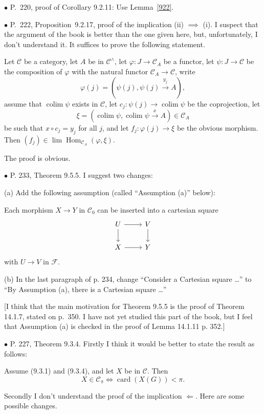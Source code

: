 \documentclass[12pt]{article}
\theoremstyle{remark}
\newcommand{\bu}{\bullet}
\newcommand{\n}{\noindent}
\newcommand{\cc}{\mathcal}
\newcommand{\C}{\mathcal C}
\newcommand{\p}{\varphi}
\newcommand{\xr}{\xrightarrow}
\newcommand{\be}{\begin{equation}}
\newcommand{\ee}{\end{equation}}
\newcommand{\pr}{Proposition}
\DeclareMathOperator*{\co}{colim}
\DeclareMathOperator{\ca}{card}
\DeclareMathOperator{\card}{card}
\DeclareMathOperator{\h}{Hom}
\begin{document}

\n$\bu$ P.~220, proof of Corollary 9.2.11: Use Lemma~\ref{922}.


\n$\bu$ P.~222, \pr\ 9.2.17, proof of the implication (ii) $\implies$ (i). I suspect that the argument of the book is better than the one given here, but, unfortunately, I don't understand it. It suffices to prove the following statement. 

Let $\C$ be a category, let $A$ be in $\C^\wedge$, let $\p:J\to\C_A$ be a functor, let $\psi:J\to\C$ be the composition of $\p$ with the natural functor $\C_A\to\C$, write 
$$
\p(j)=(\psi(j),\psi(j)\xr{y_j}A),
$$ 
assume that $\co\psi$ exists in $\C$, let $c_j:\psi(j)\to\co\psi$ be the coprojection, let 
$$
\xi=(\co\psi,\co\psi\xr x A)\in\C_A
$$ 
be such that $x\circ c_j=y_j$ for all $j$, and let $f_j:\p(j)\to\xi$ be the obvious morphism. Then $(f_j)\in\lim\h_{\C_A}(\p,\xi)$. 

The proof is obvious. 


\n$\bu$ P. 233, Theorem 9.5.5. I suggest two changes: 

\n(a) Add the following assumption (called ``Assumption (a)'' below): 

Each morphism $X\to Y$ in $\C_0$ can be inserted into a cartesian square
$$
\begin{tikzcd}
U\ar{r}\ar{d}&V\ar{d}\\ X\ar{r}&Y
\end{tikzcd}
$$ 
with $U\to V$ in $\cc F$. 

\n(b) In the last paragraph of p. 234, change ``Consider a Cartesian square \dots'' to ``By Assumption (a), there is a Cartesian square \dots'' 

[I think that the main motivation for Theorem 9.5.5 is the proof of Theorem 14.1.7, stated on p.~350. I have not yet studied this part of the book, but I feel that Assumption (a) is checked in the proof of Lemma 14.1.11 p. 352.] 



\n$\bu$ P. 227, Theorem 9.3.4. Firstly I think it would be better to state the result as follows:

Assume (9.3.1) and (9.3.4), and let $X$ be in $\C$. Then 
\be\label{934}
X\in\C_\pi\iff\ca(X(G))<\pi.
\ee 

Secondly I don't understand the proof of the implication $\Leftarrow$. Here are some possible changes. 
\end{document}
